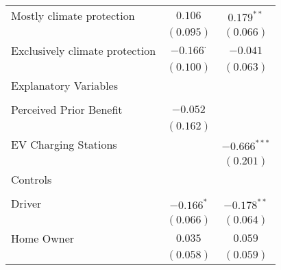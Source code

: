 \begin{center}
\begin{tiny}
\begin{longtable}{l@{} c@{} c@{}}
\quad Mostly climate protection                                                      & $0.106$          & $0.179^{**}$     \\
                                                                                     & $(0.095)$        & $(0.066)$        \\
\quad Exclusively climate protection                                                 & $-0.166^{\cdot}$ & $-0.041$         \\
                                                                                     & $(0.100)$        & $(0.063)$        \\
Explanatory Variables                                                                &                  &                  \\
                                                                                     &                  &                  \\
\quad Perceived Prior Benefit                                                        & $-0.052$         &                  \\
                                                                                     & $(0.162)$        &                  \\
\quad EV Charging Stations                                                           &                  & $-0.666^{***}$   \\
                                                                                     &                  & $(0.201)$        \\
Controls                                                                             &                  &                  \\
                                                                                     &                  &                  \\
\quad Driver                                                                         & $-0.166^{*}$     & $-0.178^{**}$    \\
                                                                                     & $(0.066)$        & $(0.064)$        \\
\quad Home Owner                                                                     & $0.035$          & $0.059$          \\
                                                                                     & $(0.058)$        & $(0.059)$        \\

\end{longtable}
\end{tiny}
\end{center}
